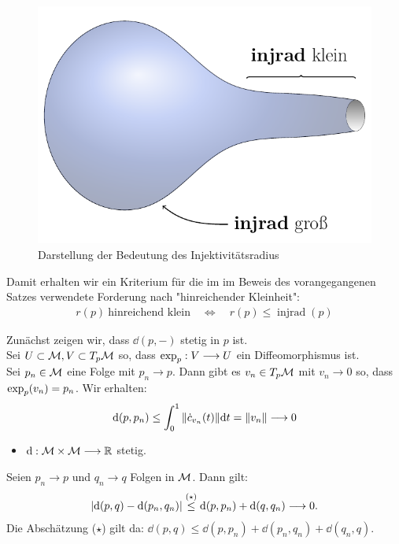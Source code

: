 \begin{figure}[H]
	\centering
	\includegraphics[scale=0.6]{figures/tikz/injrad}
	\caption{Darstellung der Bedeutung des Injektivitätsradius}
\end{figure}
Damit erhalten wir ein Kriterium für die im im Beweis des vorangegangenen Satzes verwendete Forderung nach "hinreichender Kleinheit":
\begin{align}
r(p) \ \text{hinreichend klein} \quad \Leftrightarrow \quad r(p) \leq \operatorname{injrad}(p)
\end{align}

\begin{lem}
\end{lem}
\begin{bew}
Zunächst zeigen wir, dass $\dd(p,-)$ stetig in $p$ ist. \\
Sei $U \subset \mathcal{M}, V \subset T_p\mathcal{M}$ so, dass $\operatorname{exp}_p: V \longrightarrow U$ ein Diffeomorphismus ist. \\
Sei $p_n \in \mathcal{M}$ eine Folge mit $p_n \rightarrow p$. Dann gibt es $v_n \in T_p\mathcal{M}$ mit $v_n \rightarrow 0$ so, dass $\operatorname{exp}_p(v_n) = p_n$. Wir erhalten:
\begin{align*}
\dd(p, p_n) \leq \int_0^1 \norm{\dot{c}_{v_n}(t)} \dd t = \norm{v_n} \longrightarrow 0
\end{align*}
\end{bew}

\begin{itemize}
\item $\dd: \mathcal{M} \times \mathcal{M} \longrightarrow \mathbb{R} $ stetig.
\end{itemize}
Seien $p_n \rightarrow p$ und $q_n \rightarrow q$ Folgen in $\mathcal{M}$. Dann gilt:
\begin{align*}
\abs{\dd(p, q)- \dd(p_n, q_n)} \overset{(\star)}{\leq} \dd(p, p_n) + \dd(q, q_n) \longrightarrow 0.
\end{align*}
Die Abschätzung ($\star$) gilt da: $\dd(p, q) \leq \dd(p, p_n) + \dd(p_n,q_n) + \dd(q_n, q)$. 